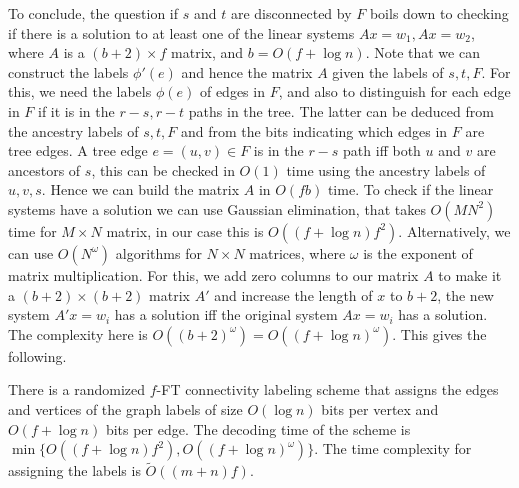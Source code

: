 To conclude, the question if $s$ and $t$ are disconnected by $F$ boils down to checking if there is a solution to at least one of the linear systems $Ax=w_1,Ax=w_2$, where $A$ is a $(b+2) \times f$ matrix, and $b=O(f + \log{n})$. Note that we can construct the labels $\phi'(e)$ and hence the matrix $A$ given the labels of $s,t,F$. For this, we need the labels $\phi(e)$ of edges in $F$, and also to distinguish for each edge in $F$ if it is in the $r-s,r-t$ paths in the tree. The latter can be deduced from the ancestry labels of $s,t,F$ and from the bits indicating which edges in $F$ are tree edges. A tree edge $e=(u,v) \in F$ is in the $r-s$ path iff both $u$ and $v$ are ancestors of $s$, this can be checked in $O(1)$ time using the ancestry labels of $u,v,s$. Hence we can build the matrix $A$ in $O(fb)$ time. To check if the linear systems have a solution we can use Gaussian elimination, that takes $O(MN^2)$ time for $M \times N$ matrix, in our case this is $O((f+\log{n})f^2)$. Alternatively, we can use $O(N^{\omega})$ algorithms for $N \times N$ matrices, where $\omega$ is the exponent of matrix multiplication.
For this, we add zero columns to our matrix $A$ to make it a $(b+2) \times (b+2)$ matrix $A'$ and increase the length of $x$ to $b+2$, the new system $A'x=w_i$ has a solution iff the original system $Ax=w_i$ has a solution. The complexity here is $O((b+2)^{\omega})=O((f+\log{n})^{\omega})$.
This gives the following. 
 
\begin{theorem}
There is a randomized $f$-FT connectivity labeling scheme that assigns the edges and vertices of the graph labels of size $O(\log{n})$ bits per vertex and $O(f + \log{n})$ bits per edge. The decoding time of the scheme is $\min\{O((f+\log{n})f^2),O((f+\log{n})^{\omega})\}$. The time complexity for assigning the labels is $\widetilde{O}((m+n)f).$
\end{theorem}  

